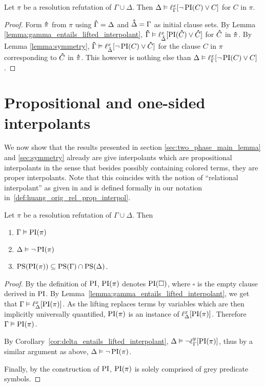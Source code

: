 \begin{corr}
	\label{cor:delta_entails_lifted_interpolant}
	Let $\pi$ be a resolution refutation of $\Gamma \cup \Delta$. 
	Then $\Delta \vDash \ell_{\Gamma}^{x}[ \lnot \operatorname{PI}(C) \lor C ]$ for $C$ in $\pi$.
\end{corr}
\begin{proof}
	Form $\bm\hat{\pi}$ from $\pi$ using $\bm\hat{\Gamma} = \Delta$ and $\bm\hat{\Delta} = \Gamma$ as initial clause sets.
	By Lemma \ref{lemma:gamma_entails_lifted_interpolant}, $\bm\hat{\Gamma} \vDash \ell_{\bm\hat{\Delta}}^{x}[ \operatorname{PI}(\bm\hat{C}) \lor \bm\hat{C} ]$ for $\bm\hat{C}$ in $\bm\hat{\pi}$. 
	By Lemma \ref{lemma:symmetry},
	$\bm\hat{\Gamma} \vDash \ell_{\bm\hat{\Delta}}^{x}[ \lnot \operatorname{PI}(C) \lor \bm\hat{C} ]$ for the clause $C$ in $\pi$ corresponding to $\bm\hat{C}$ in $\bm\hat{\pi}$. 
	This however is nothing else than 
	$\Delta \entails\nolinebreak \lft{\Gamma}{x}{ \lnot \PI(C) \lor C }$.
\end{proof}


\section{Propositional and one-sided interpolants}

We now show that the results presented in section \ref{sec:two_phase_main_lemma} and \ref{sec:symmetry}
already are give interpolants which are propositional interpolants in the sense that besides possibly containing colored terms, they are proper interpolants.
Note that this coincides with the notion of ``relational interpolant'' as given in \cite{Huang95} and is defined formally in our notation in~\ref{def:huang_orig_rel_prop_interpol}.

\begin{corr}
	\label{cor:propositional_interpolant}
	Let $\pi$ be a resolution refutation of $\Gamma \cup \Delta$.
	Then
	\begin{enumerate}
		\item$\Gamma\vDash \operatorname{PI}(\pi)$
		\item$\Delta\vDash \lnot \operatorname{PI}(\pi)$
		\item $\operatorname{PS}(\operatorname{PI}(\pi)) \subseteq \operatorname{PS}(\Gamma) \cap \operatorname{PS}(\Delta)$.
	\end{enumerate}
\end{corr}
\begin{proof}
	By the definition of $\operatorname{PI}$, 
	$\operatorname{PI}(\pi)$ denotes $\operatorname{PI}(\square)$, where $\square$ is the empty clause derived in $\operatorname{PI}$.
	By Lemma~\ref{lemma:gamma_entails_lifted_interpolant}, we get that 
	$ \Gamma \vDash \ell_{\Delta}^{x}[\operatorname{PI}(\pi)]$.
	As the lifting replaces terms by variables which are then implicitly universally quantified, $\operatorname{PI}(\pi)$ is an instance of $\ell_{\Delta}^{x}[\operatorname{PI}(\pi)]$.
	Therefore $\Gamma \vDash \operatorname{PI}(\pi)$.

	By Corollary~\ref{cor:delta_entails_lifted_interpolant}, $\Delta \vDash \lnot \ell_{\Gamma}^{y}[\operatorname{PI}(\pi)]$,
	thus by a similar argument as above, $\Delta \vDash \lnot \operatorname{PI}(\pi)$.


	Finally, by the construction of $\operatorname{PI}$, $\operatorname{PI}(\pi)$ is solely comprised of grey predicate symbols.
\end{proof}


